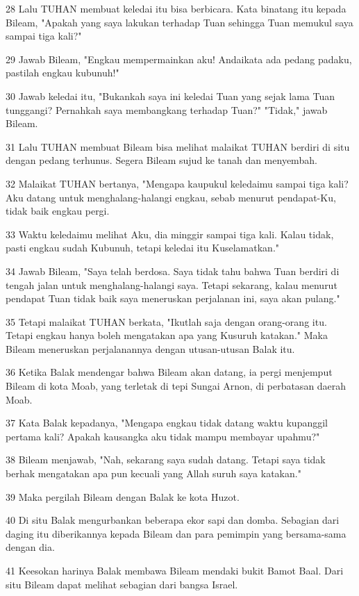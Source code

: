 \par 28 Lalu TUHAN membuat keledai itu bisa berbicara. Kata binatang itu kepada Bileam, "Apakah yang saya lakukan terhadap Tuan sehingga Tuan memukul saya sampai tiga kali?"
\par 29 Jawab Bileam, "Engkau mempermainkan aku! Andaikata ada pedang padaku, pastilah engkau kubunuh!"
\par 30 Jawab keledai itu, "Bukankah saya ini keledai Tuan yang sejak lama Tuan tunggangi? Pernahkah saya membangkang terhadap Tuan?" "Tidak," jawab Bileam.
\par 31 Lalu TUHAN membuat Bileam bisa melihat malaikat TUHAN berdiri di situ dengan pedang terhunus. Segera Bileam sujud ke tanah dan menyembah.
\par 32 Malaikat TUHAN bertanya, "Mengapa kaupukul keledaimu sampai tiga kali? Aku datang untuk menghalang-halangi engkau, sebab menurut pendapat-Ku, tidak baik engkau pergi.
\par 33 Waktu keledaimu melihat Aku, dia minggir sampai tiga kali. Kalau tidak, pasti engkau sudah Kubunuh, tetapi keledai itu Kuselamatkan."
\par 34 Jawab Bileam, "Saya telah berdosa. Saya tidak tahu bahwa Tuan berdiri di tengah jalan untuk menghalang-halangi saya. Tetapi sekarang, kalau menurut pendapat Tuan tidak baik saya meneruskan perjalanan ini, saya akan pulang."
\par 35 Tetapi malaikat TUHAN berkata, "Ikutlah saja dengan orang-orang itu. Tetapi engkau hanya boleh mengatakan apa yang Kusuruh katakan." Maka Bileam meneruskan perjalanannya dengan utusan-utusan Balak itu.
\par 36 Ketika Balak mendengar bahwa Bileam akan datang, ia pergi menjemput Bileam di kota Moab, yang terletak di tepi Sungai Arnon, di perbatasan daerah Moab.
\par 37 Kata Balak kepadanya, "Mengapa engkau tidak datang waktu kupanggil pertama kali? Apakah kausangka aku tidak mampu membayar upahmu?"
\par 38 Bileam menjawab, "Nah, sekarang saya sudah datang. Tetapi saya tidak berhak mengatakan apa pun kecuali yang Allah suruh saya katakan."
\par 39 Maka pergilah Bileam dengan Balak ke kota Huzot.
\par 40 Di situ Balak mengurbankan beberapa ekor sapi dan domba. Sebagian dari daging itu diberikannya kepada Bileam dan para pemimpin yang bersama-sama dengan dia.
\par 41 Keesokan harinya Balak membawa Bileam mendaki bukit Bamot Baal. Dari situ Bileam dapat melihat sebagian dari bangsa Israel.

